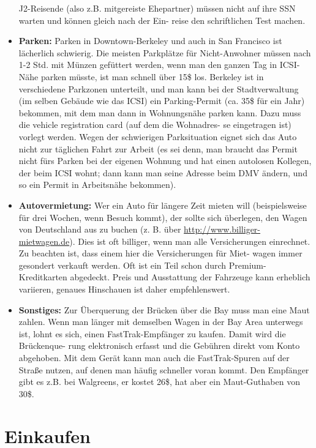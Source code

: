 \documentclass[a4paper]{scrreprt}
\begin{document}
\begin{itemize}
	J2-Reisende (also z.B. mitgereiste Ehepartner) müssen nicht auf ihre SSN warten und können gleich nach der Ein- reise den schriftlichen Test machen.

	\item \textbf{Parken:} Parken in Downtown-Berkeley und auch in San Francisco ist lächerlich schwierig. Die meisten Parkplätze für Nicht-Anwohner müssen nach 1-2 Std. mit Münzen gefüttert werden, wenn man den ganzen Tag in ICSI-Nähe parken müsste, ist man schnell über 15\$ los. Berkeley ist in verschiedene Parkzonen unterteilt, und man kann bei der Stadtverwaltung (im selben Gebäude wie das ICSI) ein Parking-Permit (ca. 35\$ für ein Jahr) bekommen, mit dem man dann in Wohnungsnähe parken kann. Dazu muss die vehicle registration card (auf dem die Wohnadres- se eingetragen ist) vorlegt werden. Wegen der schwierigen Parksituation eignet sich das Auto nicht zur täglichen Fahrt zur Arbeit (es sei denn, man braucht das Permit nicht fürs Parken bei der eigenen Wohnung und hat einen autolosen Kollegen, der beim ICSI wohnt; dann kann man seine Adresse beim DMV ändern, und so ein Permit in Arbeitsnähe bekommen).

	\item \textbf{Autovermietung:} Wer ein Auto für längere Zeit mieten will (beispielsweise für drei Wochen, wenn Besuch kommt), der sollte sich überlegen, den Wagen von Deutschland aus zu buchen (z. B. über  \url{http://www.billiger-mietwagen.de}). Dies ist oft billiger, wenn man alle Versicherungen einrechnet. Zu beachten ist, dass einem hier die Versicherungen für Miet- wagen immer gesondert verkauft werden. Oft ist ein Teil schon durch Premium-Kreditkarten abgedeckt. Preis und Ausstattung der Fahrzeuge kann erheblich variieren, genaues Hinschauen ist daher empfehlenswert.

	\item \textbf{Sonstiges:} Zur Überquerung der Brücken über die Bay muss man eine Maut zahlen. Wenn man länger mit demselben Wagen in der Bay Area unterwegs ist, lohnt es sich, einen FastTrak-Empfänger zu kaufen. Damit wird die Brückenque- rung elektronisch erfasst und die Gebühren direkt vom Konto abgehoben. Mit dem Gerät kann man auch die FastTrak-Spuren auf der Straße nutzen, auf denen man häufig schneller voran kommt. Den Empfänger gibt es z.B. bei Walgreens, er kostet 26\$, hat aber ein Maut-Guthaben von 30\$.

\end{itemize}

\section{Einkaufen}
\end{document}
